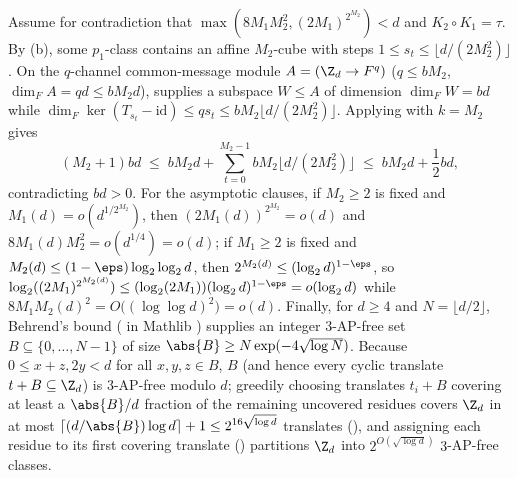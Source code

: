 \begin{outline}
Assume for contradiction that $\max(8M_1 M_2^2, (2M_1)^{2^{M_2}}) < d$ and $K_2 \circ K_1 = \tau$.
By (b), some $p_1$-class contains an affine $M_2$-cube with steps
$1 \le s_t \le \lfloor d/(2M_2^2)\rfloor$. On the $q$-channel common-message module
$A = (\Z_d \to F^q)$ ($q \le b M_2$, $\dim_F A = qd \le b M_2 d$),
\cite[Lemma~6.1 and Theorem~6.3]{SharedDecoders2026} supplies a subspace $W \le A$ of dimension
$\dim_F W = bd$ while $\dim_F\ker(T_{s_t} - \mathrm{id}) \le q s_t \le b M_2 \lfloor d/(2M_2^2)\rfloor$.
Applying  with $k = M_2$ gives
\[
  (M_2 + 1) bd \;\le\; b M_2 d + \sum_{t=0}^{M_2 - 1} b M_2 \lfloor d/(2 M_2^2)\rfloor
  \;\le\; b M_2 d + \frac{1}{2} bd,
\]
contradicting $bd > 0$. For the asymptotic clauses, if $M_2 \ge 2$ is fixed and
$M_1(d) = o(d^{1/2^{M_2}})$, then $(2M_1(d))^{2^{M_2}} = o(d)$ and $8M_1(d)M_2^2 = o(d^{1/4}) = o(d)$;
if $M_1 \ge 2$ is fixed and $M_2(d) \le (1 - \eps)\log_2\log_2 d$, then $2^{M_2(d)} \le (\log_2 d)^{1-\eps}$,
so $\log_2((2M_1)^{2^{M_2(d)}}) \le (\log_2(2M_1))(\log_2 d)^{1-\eps} = o(\log_2 d)$ while
$8M_1 M_2(d)^2 = O\bigl((\log\log d)^2\bigr) = o(d)$. Finally, for
$d \ge 4$ and $N = \lfloor d/2\rfloor$, Behrend's bound \cite{Behrend1946}
( in Mathlib \cite{Mathlib2026}) supplies an integer $3$-AP-free
set $B \subseteq \{0, \dots, N-1\}$ of size $\abs{B} \ge N\exp(-4\sqrt{\log N})$. Because
$0 \le x + z, 2y < d$ for all $x, y, z \in B$, $B$ (and hence every cyclic translate $t + B \subseteq
\Z_d$) is $3$-AP-free modulo $d$; greedily choosing translates $t_i + B$ covering at least a
$\abs{B}/d$ fraction of the remaining uncovered residues covers $\Z_d$ in at most
$\lceil (d/\abs{B})\log d\rceil + 1 \le 2^{16\sqrt{\log d}}$ translates (), and
assigning each residue to its first covering translate () partitions $\Z_d$ into
$2^{O(\sqrt{\log d})}$ $3$-AP-free classes.
\end{outline}

